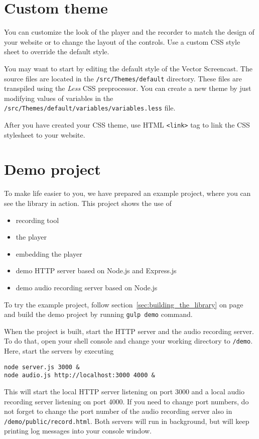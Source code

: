\section{Custom theme}
You can customize the look of the player and the recorder to match the design of your website or to change the layout of the controls. Use a custom CSS style sheet to override the default style.

You may want to start by editing the default style of the Vector Screencast. The source files are located in the \verb|/src/Themes/default| directory. These files are transpiled using the \textit{Less} CSS preprocessor. You can create a new theme by just modifying values of variables in the \verb|/src/Themes/default/variables/variables.less| file.

After you have created your CSS theme, use HTML \verb|<link>| tag to link the CSS stylesheet to your website.

\section{Demo project}
To make life easier to you, we have prepared an example project, where you can see the library in action. This project shows the use of
\begin{itemize}
	\item recording tool
	\item the player
	\item embedding the player
	\item demo HTTP server based on Node.js and Express.js
	\item demo audio recording server based on Node.js
\end{itemize}

To try the example project, follow section~\ref{sec:building_the_library} on page~\pageref{sec:building_the_library} and build the demo project by running \verb|gulp demo| command.

When the project is built, start the HTTP server and the audio recording server. To do that, open your shell console and change your working directory to \verb|/demo|. Here, start the servers by executing

\begin{lstlisting}
node server.js 3000 &
node audio.js http://localhost:3000 4000 &
\end{lstlisting}

This will start the local HTTP server listening on port 3000 and a local audio recording server listening on port 4000. If you need to change port numbers, do not forget to change the port number of the audio recording server also in \verb|/demo/public/record.html|. Both servers will run in background, but will keep printing log messages into your console window.

